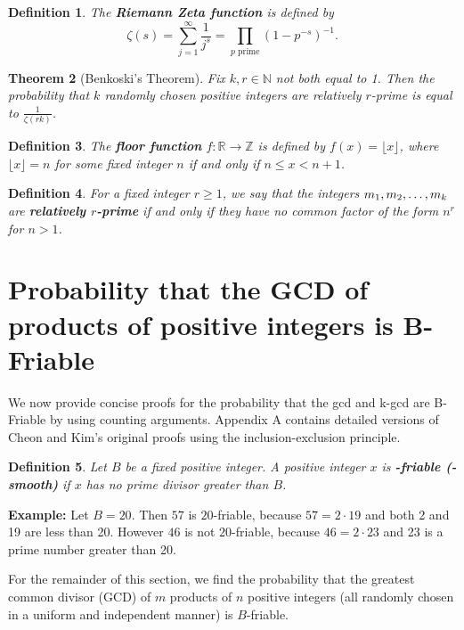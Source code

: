 \documentclass[12pt]{amsart}
\newtheorem{theorem}{Theorem}[subsection]
\newtheorem{definition}[theorem]{Definition}
\theoremstyle{definition}
\begin{document}
\begin{definition} \label{riemann-zeta}
	The \textbf{Riemann Zeta function} is defined by 
	$$\zeta(s)=\sum_{j=1}^{\infty} \frac{1}{j^s}=\prod_{p \textrm{ prime}}(1-p^{-s})^{-1}.$$
\end{definition}	

\begin{theorem}[Benkoski's Theorem]
Fix $k,r\in \mathbb{N}$ not both equal to 1. Then the probability that $k$ randomly chosen positive integers are relatively $r$-prime is equal to $\displaystyle \frac{1}{\zeta(rk)}$.
\end{theorem}


\begin{definition} The \textbf{floor function} $f: \mathbb{R} \to \mathbb{Z}$ is defined by $f(x) = \lfloor x \rfloor$, where $\lfloor x \rfloor = n$ for some fixed integer $n$ if and only if $n\leq x < n+1$.
\end{definition}

\begin{definition} For a fixed integer \(r\geq 1\), we say that the integers \(m_1,m_2,\mathellipsis,m_k\) are \textbf{relatively \(r\)-prime} if and only if they have no common factor of the form \(n^r\) for \(n>1\). 
\end{definition}

 \section{Probability that the GCD of products of positive integers is  B-Friable}
We now provide concise proofs for the probability that the gcd and k-gcd are B-Friable by using counting arguments. Appendix A contains detailed versions of Cheon and Kim's original proofs using the inclusion-exclusion principle. %

\begin{definition} Let $B$ be a fixed positive integer. A positive integer $x$ is \textbf{-friable (-smooth)} if $x$ has no prime divisor greater than $B$. 
\end{definition}

\noindent \textbf{Example:} Let $B = 20$. Then $57$ is $20$-friable, because $57 = 2 \cdot 19$ and both 2 and 19 are less than 20. However $46$ is not $20$-friable, because $46= 2 \cdot 23$ and 23 is a prime number greater than 20.

\vspace{.1 in}

For the remainder of this section, we find the probability that the greatest common divisor (GCD) of $m$ products of $n$ positive integers (all randomly chosen in a uniform and independent manner) is $B$-friable.
\end{document}
